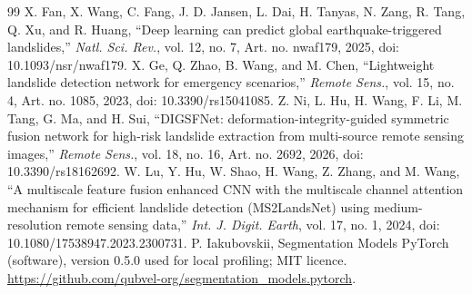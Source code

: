 \begin{thebibliography}{99}
 X. Fan, X. Wang, C. Fang, J. D. Jansen, L. Dai, H. Tanyas, N. Zang, R. Tang, Q. Xu, and R. Huang, ``Deep learning can predict global earthquake-triggered landslides,'' \emph{Natl. Sci. Rev.}, vol. 12, no. 7, Art. no. nwaf179, 2025, doi: 10.1093/nsr/nwaf179.
 X. Ge, Q. Zhao, B. Wang, and M. Chen, ``Lightweight landslide detection network for emergency scenarios,'' \emph{Remote Sens.}, vol. 15, no. 4, Art. no. 1085, 2023, doi: 10.3390/rs15041085.
 Z. Ni, L. Hu, H. Wang, F. Li, M. Tang, G. Ma, and H. Sui, ``DIGSFNet: deformation-integrity-guided symmetric fusion network for high-risk landslide extraction from multi-source remote sensing images,'' \emph{Remote Sens.}, vol. 18, no. 16, Art. no. 2692, 2026, doi: 10.3390/rs18162692.
 W. Lu, Y. Hu, W. Shao, H. Wang, Z. Zhang, and M. Wang, ``A multiscale feature fusion enhanced CNN with the multiscale channel attention mechanism for efficient landslide detection (MS2LandsNet) using medium-resolution remote sensing data,'' \emph{Int. J. Digit. Earth}, vol. 17, no. 1, 2024, doi: 10.1080/17538947.2023.2300731.
 P. Iakubovskii, Segmentation Models PyTorch (software), version 0.5.0 used for local profiling; MIT licence. \url{https://github.com/qubvel-org/segmentation_models.pytorch}.
\end{thebibliography}
